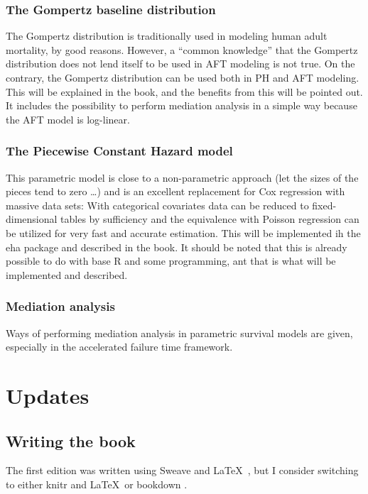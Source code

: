 \documentclass[a4paper,11pt]{article}
\begin{document}
\subsubsection{The Gompertz baseline distribution}

The Gompertz distribution is traditionally used in modeling human adult
mortality, by good reasons. However, a ``common knowledge'' that the
Gompertz distribution does not lend itself to be used in AFT modeling is
not true. On the contrary, the Gompertz distribution can be used both in PH
and AFT modeling. This will be explained in the book, and the benefits from
this will be pointed out. It includes the possibility to perform mediation
analysis in a simple way because the AFT model is log-linear.


\subsubsection{The Piecewise Constant Hazard model}

This parametric model is close to a non-parametric approach (let the sizes
of the pieces tend to zero \ldots) and is an excellent replacement for Cox
regression with massive data sets: With categorical covariates data can be
reduced to fixed-dimensional tables by sufficiency and the equivalence
with Poisson regression can be utilized for very fast and accurate
estimation. This will be implemented ih the eha package and described in
the book. It should be noted that this is already possible to do with base R
and some programming, ant that is what will be implemented and described.   

\subsubsection{Mediation analysis}

Ways of performing mediation analysis in parametric survival models are
given, especially in the accelerated failure time framework.


\section{Updates} \label{sec:updates}

\subsection{Writing the book}

The first edition was written using Sweave \citep{sweave02} and \LaTeX\
\citep{lamport}, but I consider 
switching to either knitr \citep{knitr15} and \LaTeX\ or bookdown \citep{bookdown16}.
\end{document}

